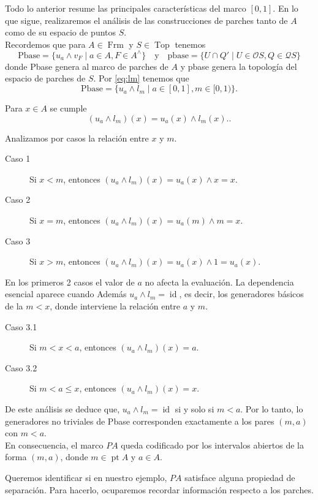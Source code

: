 \documentclass[11pt]{amsart}
\DeclareMathOperator{\pt}{pt}
\DeclareMathOperator{\id}{id}
\DeclareMathOperator{\Frm}{Frm}
\DeclareMathOperator{\Top}{Top}
\theoremstyle{plain}
\theoremstyle{definition}
\begin{document}
\begin{enumerate}
\end{enumerate}

Todo lo anterior resume las principales características del marco $[0,1]$. En lo que sigue, realizaremos el análisis de las construcciones de parches tanto de 
$A$ como de su espacio de puntos $S$.\\

Recordemos que para $A\in \Frm$ y $S\in \Top$ tenemos 
\[
\text{Pbase}=\{u_a\wedge v_F\mid a\in A, F\in A^\wedge\}\quad \text{y}\quad \text{pbase}=\{U\cap Q'\mid U\in \mathcal{O}S, Q\in \mathcal{Q}S\}
\]
donde Pbase genera al marco de parches de $A$ y pbase genera la topología del espacio de parches de $S$. Por \eqref{eq:lm} tenemos que 
\[
\text{Pbase}=\{u_a\wedge l_m\mid a\in [0,1], m\in [0,1)\}.
\]

Para $x\in A$  se cumple
\[
(u_a\wedge l_m)(x)=u_a(x)\wedge l_m(x)..
\]

Analizamos por casos la relación entre $x$ y $m$.
\begin{description}
\item[Caso 1] Si $x<m$, entonces $(u_a\wedge l_m)(x)=u_a(x)\wedge x=x$.
\item[Caso 2] Si $x=m$, entonces $(u_a\wedge l_m)(x)=u_a(m)\wedge m=x$.
\item[Caso 3] Si $x>m$, entonces $(u_a\wedge l_m)(x)=u_a(x)\wedge 1=u_a(x)$.
\end{description}

En los primeros 2 casos el valor de $a$ no afecta la evaluación. La dependencia esencial aparece cuando Además $u_a\wedge l_m=\id$, es decir, los generadores básicos de la 
$m<x$, donde interviene la relación entre $a$ y $m$.
\begin{description}
\item[Caso 3.1] Si $m<x<a$, entonces $(u_a\wedge l_m)(x)=a$.
\item[Caso 3.2] Si $m<a\leq x$, entonces $(u_a\wedge l_m)(x)=x$.
\end{description}

De este análisis se deduce que, $u_a\wedge l_m=\id$ si y solo si $m<a$. Por lo tanto, lo generadores no triviales de Pbase corresponden exactamente a los pares
$(m, a)$ con $m<a$.\\

En consecuencia, el marco $PA$ queda codificado por los intervalos abiertos de la forma $(m,a)$, donde $m\in \pt A$ y $a\in A$.

Queremos identificar si en nuestro ejemplo, $PA$ satisface alguna propiedad de separación. Para hacerlo, ocuparemos recordar información respecto a los parches.\\
\end{document}
